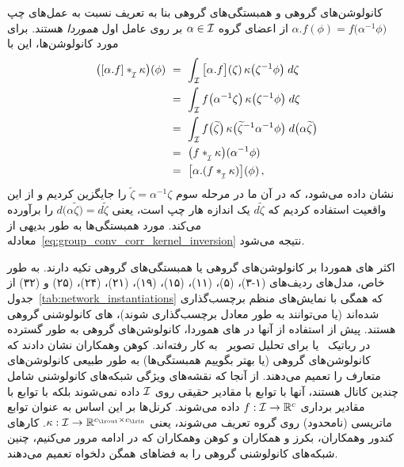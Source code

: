 کانولوشن‌های گروهی و همبستگی‌های گروهی بنا به تعریف نسبت به عمل‌های چپ $\alpha.f(\phi) = f\big( \alpha^{-1}\phi \big)$ از اعضای گروه $\alpha\in\mathcal{I}$ بر روی عامل اول \emph{هموردا} هستند.
برای مورد کانولوشن‌ها، این با
\begin{align}\label{eq:group_conv_equivariance}
	\big( [\alpha.f] \ast_{\overset{}{\protect\scalebox{.64}{$\mkern-.5mu \I$}}} \kappa \big)(\phi)
	\ &=\ \int_{\I} \big[\alpha.f \big](\zeta)\, \kappa\big( \zeta^{-1} \phi \big) \; d\zeta \notag \\
	\ &=\ \int_{\I} f\big( \alpha^{-1} \zeta\big)\, \kappa\big( \zeta^{-1} \phi \big) \; d\zeta \notag \\
	\ &=\ \int_{\I} f\big(\widetilde{\zeta} \big)\, \kappa\big( \widetilde{\zeta}^{-1} \alpha^{-1} \phi \big) \; d\big( \alpha \widetilde{\zeta} \big) \notag \\
	\ &=\ \big( f \ast_{\overset{}{\protect\scalebox{.64}{$\mkern-.5mu \I$}}} \kappa \big) (\alpha^{-1} \phi) \notag \\
	\ &=\ \big[\alpha.( f \ast_{\overset{}{\protect\scalebox{.64}{$\mkern-.5mu \I$}}} \kappa )\big] (\phi) \,,
\end{align}
نشان داده می‌شود، که در آن ما در مرحله سوم $\widetilde{\zeta} = \alpha^{-1}\zeta$ را جایگزین کردیم و از این واقعیت استفاده کردیم که $d\widetilde{\zeta}$ یک اندازه هار چپ است، یعنی $d\big(\alpha \widetilde{\zeta}\big) = d\widetilde{\zeta}$ را برآورده می‌کند.
مورد همبستگی‌ها به طور بدیهی از معادله~\eqref{eq:group_conv_corr_kernel_inversion} نتیجه می‌شود.


اکثر های هموردا بر کانولوشن‌های گروهی یا همبستگی‌های گروهی تکیه دارند.
به طور خاص، مدل‌های ردیف‌های (۱-۳)، (۵)، (۱۱)، (۱۵)، (۱۹)، (۲۱)، (۲۴)، (۲۵) و (۳۲) از جدول~\ref{tab:network_instantiations} که همگی با نمایش‌های منظم برچسب‌گذاری شده‌اند (یا می‌توانند به طور معادل برچسب‌گذاری شوند)، های کانولوشنی گروهی هستند.
پیش از استفاده از آنها در های هموردا، کانولوشن‌های گروهی به طور گسترده در رباتیک~\cite{chirikjian1998numerical} یا برای تحلیل تصویر~\cite{mallat2012group,sifre2012combined,Sifre2013-GSCAT,bruna2013invariant,sifre2014rigid,oyallon2015scattering} به کار رفته‌اند.
کوهن وهمکاران\cite{Cohen2016-GCNN} نشان دادند که کانولوشن‌های گروهی (یا بهتر بگوییم همبستگی‌ها) به طور طبیعی کانولوشن‌های متعارف را تعمیم می‌دهند.
از آنجا که نقشه‌های ویژگی شبکه‌های کانولوشنی شامل چندین کانال هستند، آنها با توابع با مقادیر حقیقی روی $\mathcal{I}$ داده نمی‌شوند بلکه با توابع با مقادیر برداری $f: \mathcal{I} \to \mathbb{R}^c$ داده می‌شوند.
کرنل‌ها بر این اساس به عنوان توابع ماتریسی (نامحدود) روی گروه تعریف می‌شوند، یعنی $\kappa: \I \to \R^{\cout\times\cin}$.
کارهای کندور وهمکاران\cite{Kondor2018-GENERAL}، بکرز و همکاران\cite{bekkers2020bspline} و کوهن وهمکاران\cite{Cohen2018-intertwiners}\cite{Cohen2019-generaltheory} که در ادامه مرور می‌کنیم، چنین شبکه‌های کانولوشنی گروهی را به فضاهای همگن دلخواه تعمیم می‌دهند.







